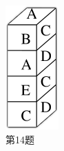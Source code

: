 \documentclass[10pt, a4paper]{article}
\begin{document}
\begin{enumerate}
\begin{figure}[htbp]
\begin{minipage}[t]{.08\textwidth}
                \includegraphics[width=\textwidth]{14.png}
                \caption*{第14题}
            \end{minipage}
        \end{figure}


\end{enumerate}
\end{document}
